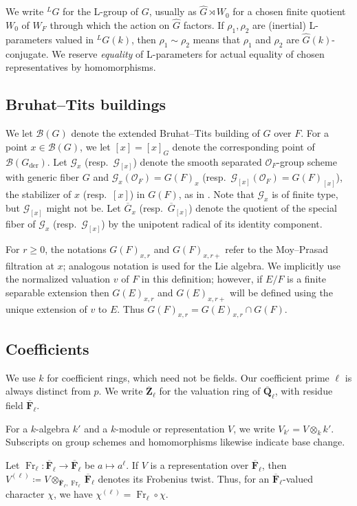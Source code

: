 \documentclass[reqno]{amsart}
\numberwithin{equation}{subsection}
\newcommand{\F}{\mathbf{F}}
\newcommand{\Q}{\mathbf{Q}}
\newcommand{\Z}{\mathbf{Z}}
\newcommand{\ol}[1]{\overline{#1}}
\newcommand{\wh}[1]{\widehat{#1}}
\newcommand{\co}{\colon}
\newcommand{\ld}{{}^L}
\newcommand\cB{\mathcal{B}}
\newcommand\cG{\mathcal{G}}
\newcommand\cO{\mathcal{O}}
\DeclareMathOperator{\der}{der}
\DeclareMathOperator{\Fr}{Fr}
\theoremstyle{remark}
\numberwithin{equation}{subsection}
\numberwithin{figure}{subsection}
\begin{document}
We write $\ld G$ for the L-group of $G$, usually as $\widehat G\rtimes W_0$ for a chosen finite quotient $W_0$ of $W_F$ through which the action on $\widehat G$ factors. If $\rho_1,\rho_2$ are (inertial) L-parameters valued in $\ld G(k)$, then $\rho_1\sim\rho_2$ means that $\rho_1$ and $\rho_2$ are $\wh G(k)$-conjugate. We reserve \emph{equality} of L-parameters for actual equality of chosen representatives by homomorphisms.


\subsection{Bruhat--Tits buildings}
We let $\cB(G)$ denote the extended Bruhat--Tits building of $G$ over $F$. For a point $x \in \cB(G)$, we let $[x] = [x]_G$ denote the corresponding point of $\cB(G_{\der})$. Let $\cG_x$ (resp.\ $\cG_{[x]}$) denote the smooth separated $\cO_F$-group scheme with generic fiber $G$ and $\cG_x(\cO_F) = G(F)_x$ (resp.\ $\cG_{[x]}(\cO_F) = G(F)_{[x]}$), the stabilizer of $x$ (resp.\ $[x]$) in $G(F)$, as in \cite[Remark 8.3.4]{KP}. Note that $\cG_x$ is of finite type, but $\cG_{[x]}$ might not be. Let $\ol G_x$ (resp.\ $\ol G_{[x]}$) denote the quotient of the special fiber of $\cG_x$ (resp.\ $\cG_{[x]}$) by the unipotent radical of its identity component.

For $r\geq 0$, the notations $G(F)_{x,r}$ and $G(F)_{x,r+}$ refer to the Moy--Prasad filtration at $x$; analogous notation is used for the Lie algebra. We implicitly use the normalized valuation $v$ of $F$ in this definition; however, if $E/F$ is a finite separable extension then $G(E)_{x,r}$ and $G(E)_{x,r+}$ will be defined using the unique extension of $v$ to $E$. Thus $G(F)_{x,r} = G(E)_{x,r} \cap G(F)$.


\subsection{Coefficients}\label{sssec:coefficient-conventions-fs}
We use $k$ for coefficient rings, which need not be fields. Our coefficient prime $\ell$ is always distinct from $p$. We write $\ol\Z_\ell$ for the valuation ring of $\ol\Q_\ell$, with residue field $\ol\F_\ell$.

For a $k$-algebra $k'$ and a $k$-module or representation $V$, we write $V_{k'}=V\otimes_k k'$. Subscripts on group schemes and homomorphisms likewise indicate base change.

Let $\Fr_\ell\co\ol\F_\ell\to\ol\F_\ell$ be $a\mapsto a^\ell$. If $V$ is a representation over $\ol\F_\ell$, then $V^{(\ell)} \coloneqq V \otimes_{\ol \F_\ell, \Fr_\ell} \ol \F_\ell$ denotes its Frobenius twist. Thus, for an $\ol\F_\ell$-valued character $\chi$, we have $\chi^{(\ell)}=\Fr_\ell\circ\chi$. 
\end{document}
